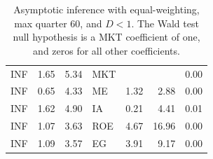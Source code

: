 \documentclass[12pt]{article}
\begin{document}
\begin{table}[ht]
\begin{tabular}{lrrlrrr}
		\hline
		INF & 1.65 & 5.34 & MKT &  &  & 0.00 \\ 
		INF & 0.65 & 4.33 & ME & 1.32 & 2.88 & 0.00 \\ 
		INF & 1.62 & 4.90 & IA & 0.21 & 4.41 & 0.01 \\ 
		INF & 1.07 & 3.63 & ROE & 4.67 & 16.96 & 0.00 \\ 
		INF & 1.09 & 3.57 & EG & 3.91 & 9.17 & 0.00 \\ 
		\hline
		\hline
	\end{tabular}
	\caption{Asymptotic inference with equal-weighting, max quarter 60, and $D<1$. The Wald test null hypothesis is a MKT coefficient of one, and zeros for all other coefficients.}
	\label{tab:ai_60_ew_indep}
\end{table}


\end{document}
